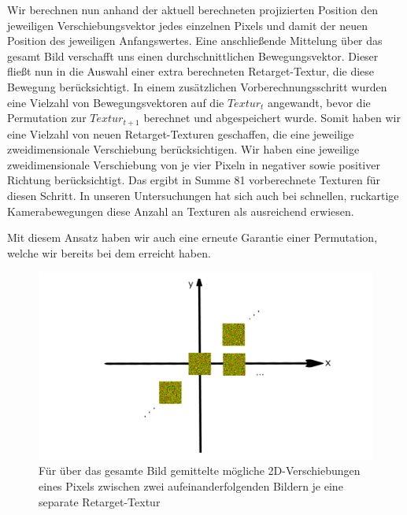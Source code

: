 Wir berechnen nun anhand der aktuell berechneten projizierten Position den jeweiligen Verschiebungsvektor jedes einzelnen 
Pixels und damit der neuen Position des jeweiligen Anfangswertes. Eine anschließende Mittelung über das gesamt Bild verschafft 
uns einen durchschnittlichen Bewegungsvektor. Dieser fließt nun in die Auswahl einer extra berechneten Retarget-Textur, die diese
Bewegung berücksichtigt. In einem zusätzlichen Vorberechnungsschritt wurden eine Vielzahl von Bewegungsvektoren auf die 
 $Textur_{t}$ angewandt, bevor die Permutation zur $Textur_{t+1}$ berechnet und abgespeichert
wurde. Somit haben wir eine Vielzahl von neuen Retarget-Texturen geschaffen, die eine jeweilige zweidimensionale Verschiebung 
berücksichtigen. Wir haben eine jeweilige zweidimensionale Verschiebung von je vier Pixeln in negativer sowie positiver Richtung 
berücksichtigt. Das ergibt in Summe 81 vorberechnete Texturen für diesen Schritt. In unseren Untersuchungen hat sich auch bei schnellen, ruckartige Kamerabewegungen diese Anzahl 
an Texturen als ausreichend erwiesen.

\par 
Mit diesem Ansatz haben wir auch eine erneute Garantie einer Permutation, welche wir bereits bei dem 
erreicht haben.

\begin{figure}[H]
  \centering
  \includegraphics[width=\linewidth]{content/TemporalerAlg/Bilder/Reprojection/Verschiebungsvektor.png}
  \caption{Für über das gesamte Bild gemittelte mögliche 2D-Verschiebungen eines Pixels zwischen zwei aufeinanderfolgenden Bildern je eine separate Retarget-Textur}
  \label{pic:Verschiebungsvektor}
\end{figure}

\newpage

